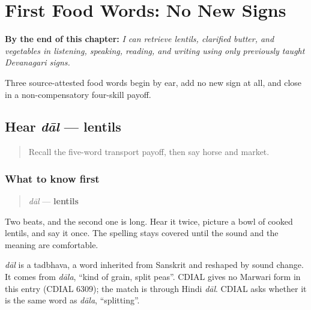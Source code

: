 
\chapter{First Food Words: No New Signs}
\label{ch:mw-food-three}

\begin{chapteropening}
\textbf{By the end of this chapter:} \emph{I can retrieve lentils, clarified butter, and vegetables in listening, speaking, reading, and writing using only previously taught Devanagari signs.}

Three source-attested food words begin by ear, add no new sign at all, and close in a non-compensatory four-skill payoff.
\end{chapteropening}

\section[dāl]{Hear \emph{dāl} — lentils}

\label{lesson:MW-C18-hear-daal}



\begin{quote}
Recall the five-word transport payoff, then say horse and market.
\end{quote}

\subsection*{What to know first}
\begin{quote}
\emph{dāl} — \textbf{lentils}
\end{quote}

Two beats, and the second one is long. Hear it twice, picture a bowl of cooked lentils, and say it once. The spelling stays covered until the sound and the meaning are comfortable.

\begin{cousinweb}
\emph{dāl} is a tadbhava, a word inherited from Sanskrit and reshaped by sound change. It comes from \emph{dāla}, \textquotedblleft{}kind of grain, split peas\textquotedblright{}. CDIAL gives no Marwari form in this entry (CDIAL 6309); the match is through Hindi \emph{dāl}. CDIAL asks whether it is the same word as \emph{dāla}, \textquotedblleft{}splitting\textquotedblright{}.
\end{cousinweb}

